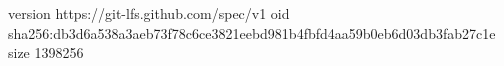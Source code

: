 version https://git-lfs.github.com/spec/v1
oid sha256:db3d6a538a3aeb73f78c6ce3821eebd981b4fbfd4aa59b0eb6d03db3fab27c1e
size 1398256
